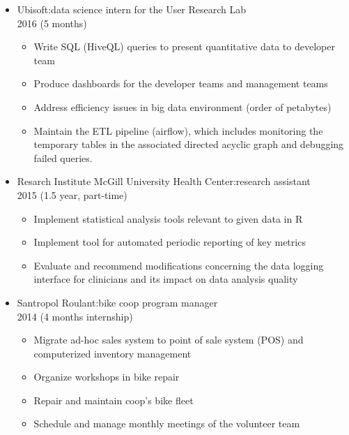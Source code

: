 \documentclass{article}
\begin{document}
\begin{itemize}
\clearpage

  \item Ubisoft:\@ data science intern for the User Research Lab\\ 2016 (5 months)
    \begin{itemize}
      \item Write SQL (HiveQL) queries to present quantitative data to developer team
      \item Produce dashboards for the developer teams and management teams
      \item Address efficiency issues in big data environment (order of petabytes)
      \item Maintain the ETL pipeline (airflow), which includes monitoring
        the temporary tables in the associated directed acyclic graph and debugging failed queries.
    \end{itemize}

  \item Resarch Institute McGill University Health Center:\@ research assistant\\ 2015 (1.5 year, part-time)
    \begin{itemize}
      \item Implement statistical analysis tools relevant to given data in R
      \item Implement tool for automated periodic reporting of key metrics
      \item Evaluate and recommend modifications concerning the data logging
        interface for clinicians and its impact on data analysis quality
    \end{itemize}

  \item Santropol Roulant:\@ bike coop program manager\\ 2014 (4 months internship)
    \begin{itemize}
      \item Migrate ad-hoc sales system to point of sale system (POS) and computerized inventory management
      \item Organize workshops in bike repair
      \item Repair and maintain coop's bike fleet
      \item Schedule and manage monthly meetings of the volunteer team
    \end{itemize}

\end{itemize}
\end{document}
